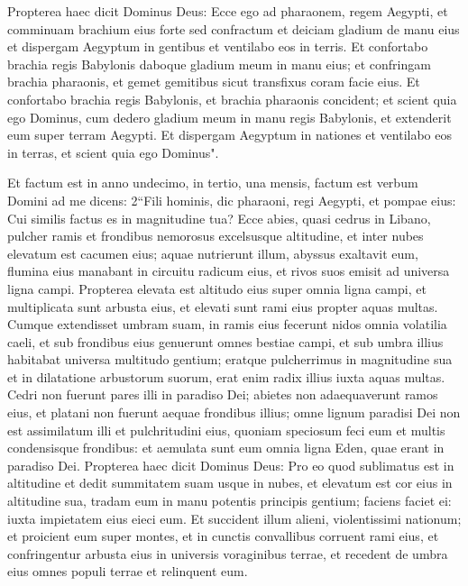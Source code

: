 \begin{biblechapter}
\verse Propterea haec dicit Dominus Deus: Ecce ego ad pharaonem, regem Aegypti, et comminuam brachium eius forte sed confractum et deiciam gladium de manu eius 
\verse et dispergam Aegyptum in gentibus et ventilabo eos in terris.  
\verse Et confortabo brachia regis Babylonis daboque gladium meum in manu eius; et confringam brachia pharaonis, et gemet gemitibus sicut transfixus coram facie eius. 
\verse Et confortabo brachia regis Babylonis, et brachia pharaonis concident; et scient quia ego Dominus, cum dedero gladium meum in manu regis Babylonis, et extenderit eum super terram Aegypti. 
\verse Et dispergam Aegyptum in nationes et ventilabo eos in terras, et scient quia ego Dominus". 
\end{biblechapter}

\begin{biblechapter}  
\verse Et factum est in anno undecimo, in tertio, una mensis, factum est verbum Domini ad me dicens: 2“Fili hominis, dic pharaoni, regi Aegypti, et pompae eius: Cui similis factus es in magnitudine tua? 
\verse Ecce abies, quasi cedrus in Libano, pulcher ramis et frondibus nemorosus excelsusque altitudine, et inter nubes elevatum est cacumen eius; 
\verse aquae nutrierunt illum, abyssus exaltavit eum, flumina eius manabant in circuitu radicum eius, et rivos suos emisit ad universa ligna campi. 
\verse Propterea elevata est altitudo eius super omnia ligna campi, et multiplicata sunt arbusta eius, et elevati sunt rami eius propter aquas multas. 
\verse Cumque extendisset umbram suam, in ramis eius fecerunt nidos omnia volatilia caeli, et sub frondibus eius genuerunt omnes bestiae campi, et sub umbra illius habitabat universa multitudo gentium; 
\verse eratque pulcherrimus in magnitudine sua et in dilatatione arbustorum suorum, erat enim radix illius iuxta aquas multas. 
\verse Cedri non fuerunt pares illi in paradiso Dei; abietes non adaequaverunt ramos eius, et platani non fuerunt aequae frondibus illius; omne lignum paradisi Dei non est assimilatum illi et pulchritudini eius, 
\verse quoniam speciosum feci eum et multis condensisque frondibus: et aemulata sunt eum omnia ligna Eden, quae erant in paradiso Dei. 
\verse Propterea haec dicit Dominus Deus: Pro eo quod sublimatus est in altitudine et dedit summitatem suam usque in nubes, et elevatum est cor eius in altitudine sua, 
\verse tradam eum in manu potentis principis gentium; faciens faciet ei: iuxta impietatem eius eieci eum. 
\verse Et succident illum alieni, violentissimi nationum; et proicient eum super montes, et in cunctis convallibus corruent rami eius, et confringentur arbusta eius in universis voraginibus terrae, et recedent de umbra eius omnes populi terrae et relinquent eum. 

\end{biblechapter}
